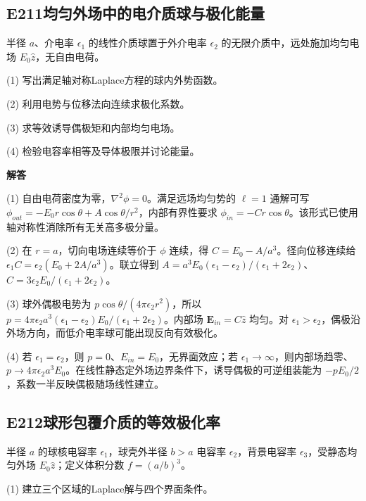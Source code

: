 
\subsection*{E211\quad 均匀外场中的电介质球与极化能量}

半径 $a$、介电率 $\epsilon_1$ 的线性介质球置于外介电率 $\epsilon_2$ 的无限介质中，远处施加均匀电场 $E_0\hat z$，无自由电荷。

(1) 写出满足轴对称Laplace方程的球内外势函数。

(2) 利用电势与位移法向连续求极化系数。

(3) 求等效诱导偶极矩和内部均匀电场。

(4) 检验电容率相等及导体极限并讨论能量。

\par\textbf{解答}

(1) 自由电荷密度为零，$\nabla^2\phi=0$。满足远场均匀势的 $\ell=1$ 通解可写 $\phi_{out}=-E_0r\cos\theta+A\cos\theta/r^2$，内部有界性要求 $\phi_{in}=-Cr\cos\theta$。该形式已使用轴对称性消除所有无关高多极分量。

(2) 在 $r=a$，切向电场连续等价于 $\phi$ 连续，得 $C=E_0-A/a^3$。径向位移连续给 $\epsilon_1C=\epsilon_2(E_0+2A/a^3)$。联立得到 $A=a^3E_0(\epsilon_1-\epsilon_2)/(\epsilon_1+2\epsilon_2)$、$C=3\epsilon_2E_0/(\epsilon_1+2\epsilon_2)$。

(3) 球外偶极电势为 $p\cos\theta/(4\pi\epsilon_2r^2)$，所以 $p=4\pi\epsilon_2a^3(\epsilon_1-\epsilon_2)E_0/(\epsilon_1+2\epsilon_2)$。内部场 $\mathbf E_{in}=C\hat z$ 均匀。对 $\epsilon_1>\epsilon_2$，偶极沿外场方向，而低介电率球可能出现反向有效极化。

(4) 若 $\epsilon_1=\epsilon_2$，则 $p=0$、$E_{in}=E_0$，无界面效应；若 $\epsilon_1\to\infty$，则内部场趋零、$p\to4\pi\epsilon_2a^3E_0$。在线性静态定外场边界条件下，诱导偶极的可逆组装能为 $-pE_0/2$，系数一半反映偶极随场线性建立。

\par\medskip

\subsection*{E212\quad 球形包覆介质的等效极化率}

半径 $a$ 的球核电容率 $\epsilon_1$，球壳外半径 $b>a$ 电容率 $\epsilon_2$，背景电容率 $\epsilon_3$，受静态均匀外场 $E_0\hat z$；定义体积分数 $f=(a/b)^3$。

(1) 建立三个区域的Laplace解与四个界面条件。

